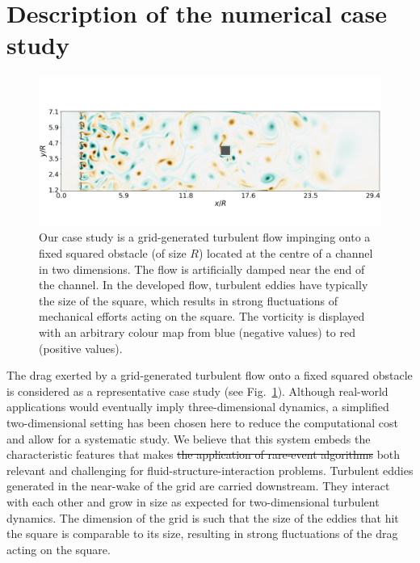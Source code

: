 \documentclass{jfm}
\newcommand{\EL}[1]{{\color{myred}{#1}}}
\begin{document}
\section{Description of the numerical case study}
\label{sec:test_flow}

\begin{figure}
	\centering
	\includegraphics[width=\linewidth]{illustr_ecoulement/illustr_ecoulement}
	\caption{Our case study is a grid-generated turbulent flow impinging onto a fixed squared obstacle (of size $R$) located at the centre of a channel in two dimensions. The flow is artificially damped near the end of the channel. In the developed flow, turbulent eddies have typically the size of the square, which results in strong fluctuations of mechanical efforts acting on the square. The vorticity is displayed with an arbitrary colour map from blue (negative values) to red (positive values).}
	\label{fig:illustr_ecoulement}
\end{figure}

%
The drag exerted by a grid-generated turbulent flow onto a fixed squared obstacle is considered as a representative case study (see Fig.~\ref{fig:illustr_ecoulement}).
%
Although real-world applications would eventually imply three-dimensional dynamics, a simplified two-dimensional setting has been chosen here to reduce the computational cost and allow for a systematic study.
%
We believe that this system embeds the characteristic features that makes \sout{the application of rare-event algorithms} \EL{this study} both relevant and challenging for fluid-structure-interaction problems.
%
Turbulent eddies generated in the near-wake of the grid are carried downstream.
They interact with each other and grow in size as expected for two-dimensional turbulent dynamics.
The dimension of the grid is such that the size of the eddies that hit the square is comparable to its size, resulting in strong fluctuations of the drag acting on the square.
%
%
%
\end{document}

